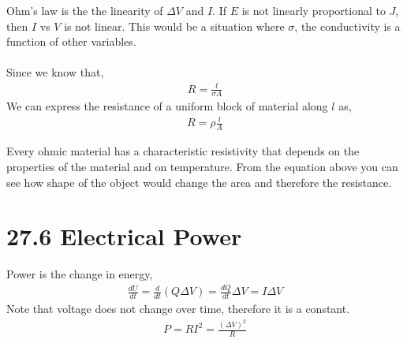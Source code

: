\documentclass[12pt, titlepage, oneside]{article}
\begin{document}
Ohm's law is the the linearity of $\Delta V$ and $I$. If $E$ is not linearly proportional to $J$, then $I$ vs $V$ is not linear. This would be a situation where $\sigma$, the conductivity is a function of other variables.
\\

\noindent{}
\\

Since we know that,
\begin{align*}
R = \frac{l}{\sigma A}
\end{align*}
We can express the resistance of a uniform block of material along $l$ as,
\begin{align*}
R = \rho \frac{l}{A}
\end{align*}

Every ohmic material has a characteristic resistivity that depends on the properties of the material and on temperature. From the equation above you can see how shape of the object would change the area and therefore the resistance.\newpage

\section*{27.6 Electrical Power }
Power is the change in energy,
\begin{align*}
\frac{dU}{dt} = \frac{d}{dt}(Q\Delta V) = \frac{dQ}{dt}\Delta V = I \Delta V
\end{align*}
Note that voltage does not change over time, therefore it is a constant.
\begin{align*}
P = RI^2 = \frac{(\Delta V)^2}{R}
\end{align*}
\end{document}
